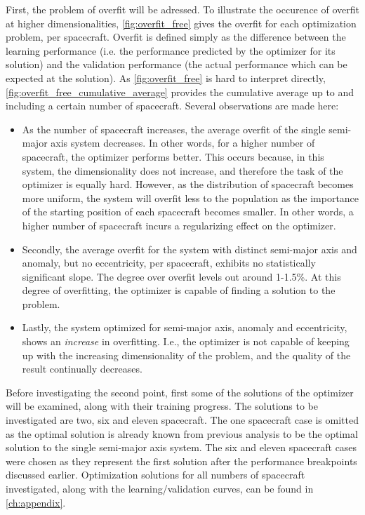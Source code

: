 First, the problem of overfit will be adressed. To illustrate the occurence of overfit at higher dimensionalities, \autoref{fig:overfit_free} gives the overfit for each optimization problem, per spacecraft. Overfit is defined simply as the difference between the learning performance (i.e. the performance predicted by the optimizer for its solution) and the validation performance (the actual performance which can be expected at the solution). As \autoref{fig:overfit_free} is hard to interpret directly, \autoref{fig:overfit_free_cumulative_average} provides the cumulative average up to and including a certain number of spacecraft. Several observations are made here:
\begin{itemize}
 \item As the number of spacecraft increases, the average overfit of the single semi-major axis system decreases. In other words, for a higher number of spacecraft, the optimizer performs better. This occurs because, in this system, the dimensionality does not increase, and therefore the task of the optimizer is equally hard. However, as the distribution of spacecraft becomes more uniform, the system will overfit less to the population as the importance of the starting position of each spacecraft becomes smaller. In other words, a higher number of spacecraft incurs a regularizing effect on the optimizer.
 \item Secondly, the average overfit for the system with distinct semi-major axis and anomaly, but no eccentricity, per spacecraft, exhibits no statistically significant slope. The degree over overfit levels out around 1-1.5\%. At this degree of overfitting, the optimizer is capable of finding a solution to the problem. 
 \item Lastly, the system optimized for semi-major axis, anomaly and eccentricity, shows an \textit{increase} in overfitting. I.e., the optimizer is not capable of keeping up with the increasing dimensionality of the problem, and the quality of the result continually decreases.
\end{itemize}
Before investigating the second point, first some of the solutions of the optimizer will be examined, along with their training progress. The solutions to be investigated are two, six and eleven spacecraft. The one spacecraft case is omitted as the optimal solution is already known from previous analysis to be the optimal solution to the single semi-major axis system. The six and eleven spacecraft cases were chosen as they represent the first solution after the performance breakpoints discussed earlier. Optimization solutions for all numbers of spacecraft investigated, along with the learning/validation curves, can be found in \autoref{ch:appendix}.
